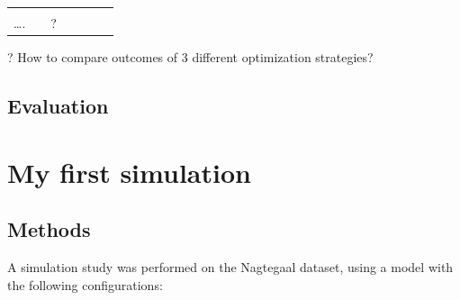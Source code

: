 \documentclass[
]{book}
\begin{document}
\begin{longtable}[]{@{}lllllll@{}}
\begin{minipage}[t]{0.10\columnwidth}
\strut
\end{minipage} & \begin{minipage}[t]{0.10\columnwidth}\raggedright
\strut
\end{minipage} & \begin{minipage}[t]{0.10\columnwidth}\raggedright
\strut
\end{minipage}\tabularnewline
\begin{minipage}[t]{0.29\columnwidth}\raggedright
\ldots.\strut
\end{minipage} & \begin{minipage}[t]{0.03\columnwidth}\raggedright
\strut
\end{minipage} & \begin{minipage}[t]{0.10\columnwidth}\raggedright
?\strut
\end{minipage} & \begin{minipage}[t]{0.10\columnwidth}\raggedright
\strut
\end{minipage} & \begin{minipage}[t]{0.10\columnwidth}\raggedright
\strut
\end{minipage} & \begin{minipage}[t]{0.10\columnwidth}\raggedright
\strut
\end{minipage} & \begin{minipage}[t]{0.10\columnwidth}\raggedright
\strut
\end{minipage}\tabularnewline
\bottomrule
\end{longtable}

? How to compare outcomes of 3 different optimization strategies?

\hypertarget{evaluation}{%
\section{Evaluation}\label{evaluation}}

\hypertarget{my-first-simulation}{%
\chapter{My first simulation}\label{my-first-simulation}}

\hypertarget{methods}{%
\section{Methods}\label{methods}}

A simulation study was performed on the Nagtegaal dataset, using a model with the following configurations:
\end{document}
